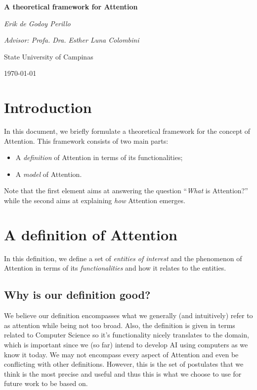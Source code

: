 \documentclass[7pt]{article}
\begin{document}

\begin{titlepage}
	\centering
	{\scshape\Large \par}
	\vspace{3.5cm}
	{\huge\bfseries A theoretical framework for Attention\par}
	\vspace{1cm}
	{\itshape Erik de Godoy Perillo\par}
	{\itshape Advisor: Profa. Dra. Esther Luna Colombini\par}
	\vspace{0.5cm}
	\vfill
	State University of Campinas
	\vfill
	{\large \today\par}
\end{titlepage}

\newpage




\section{Introduction}
In this document, we briefly formulate a theoretical framework for the concept of Attention.
This framework consists of two main parts:
\begin{itemize}
    \item A \emph{definition} of Attention in terms of its functionalities;
    \item A \emph{model} of Attention.
\end{itemize}
Note that the first element aims at answering the question ``\emph{What} is Attention?''
while the second aims at explaining \emph{how} Attention emerges.

\section{A definition of Attention}
\label{sec:definition}
In this definition, we define a set of \emph{entities of interest} and the phenomenon of Attention in terms of
its \emph{functionalities} and how it relates to the entities.

\subsection{Why is our definition good?}
We believe our definition encompasses what we generally (and intuitively) refer to as attention while being not too broad.
Also, the definition is given in terms related to Computer Science so it’s functionality nicely translates to the domain,
which is important since we (so far) intend to develop AI using computers as we know it today.
We may not encompass every aspect of Attention and even be conflicting with other definitions.
However, this is the set of postulates that we think is the most precise and useful and thus this is
what we choose to use for future work to be based on.
\end{document}
